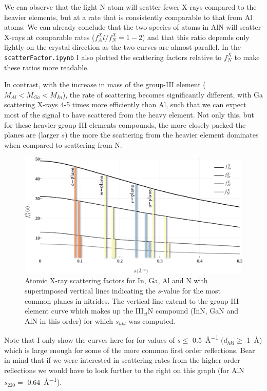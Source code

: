 We can observe that the light N atom will scatter fewer X-rays compared to the heavier elements, but at a rate that is consistently comparable to that from Al atoms. We can already conclude that the two species of atoms in AlN will scatter X-rays at comparable rates ($f^X_Al / f^X_N = 1-2 $) and that this ratio depends only lightly on the crystal direction as the two curves are almost parallel. In the \texttt{scatterFactor.ipynb} I also plotted the scattering factors relative to $f^X_{N}$ to make these ratios more readable.  

In contrast, with the increase in mass of the group-III element ($M_{Al}<M_{Ga}<M_{In}$), the rate of scattering becomes significantly different, with Ga scattering X-rays 4-5 times more efficiently than Al, such that we can expect most of the signal to have scattered from the heavy element. Not only this, but for these heavier group-III elements compounds, the more closely packed the planes are (larger $s$) the more the scattering from the heavier element dominates when compared to scattering from N.


\begin{figure}
    \centering
\includegraphics[width=1\linewidth]{Figures/scatterFactorX.png}
\caption[Atomic X-ray scattering factors.]{Atomic X-ray scattering factors for In, Ga, Al and N with superimposed vertical lines indicating the $s$-value for the most common planes in nitrides. The vertical line extend to the group III element curve which makes up the III$_{el}$N compound (\ie InN, GaN and AlN in this order) for which $s_{hkl}$ was computed.}
\label{Fig:scatterFactorX}
\end{figure}

Note that I only show the curves here for for values of $s\leq$ \SI{0.5}{\angstrom^{-1}} ($d_{hkl}\geq$ \SI{1}{\angstrom}) which is large enough for some of the more common first order reflections. Bear in mind that if we were interested in scattering rates from the higher order reflections we would have to look further to the right on this graph (for AlN $s_{220} = $ \SI{0.64}{\angstrom^{-1}}).





